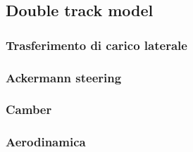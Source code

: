 \subsection{Double track model}
\subsubsection{Trasferimento di carico laterale}
\subsubsection{Ackermann steering}
\subsubsection{Camber}
\subsubsection{Aerodinamica}